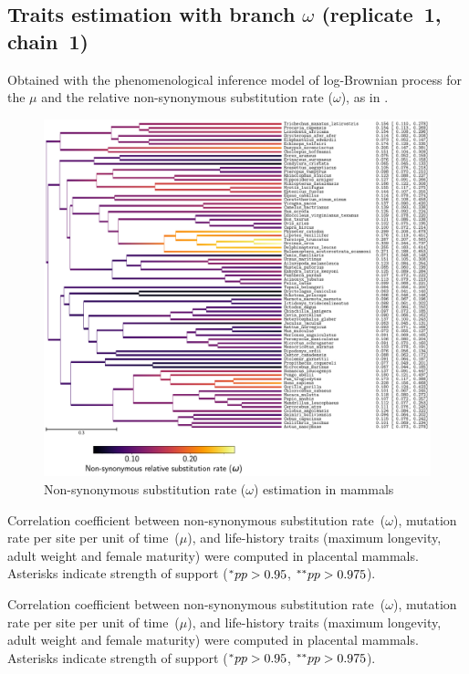 \documentclass{article}
\begin{document}
	\subsection{Traits estimation with branch \texorpdfstring{$\omega$}{ω} (replicate~1, chain~1)}
	Obtained with the phenomenological inference model of log-Brownian process for the $\mu$ and the relative {non-synonymous} {substitution} rate ($\omega$), as in \citet{Lartillot2011}.

	\begin{figure}[H]
		\centering
		\includegraphics[width=\linewidth, page=1]{mammals/18CDS_BranchOmega_R1_LogdNdS}
		\caption[$\omega$ estimation in mammals]{{Non-synonymous substitution} rate ($\omega$) estimation in mammals}
	\end{figure}

	\begin{table}[H]
		
		\caption[Correlation coefficient matrix in mammals ($\omega$)]{
		Correlation coefficient between {non-synonymous} {substitution} rate~($\omega$), mutation rate per site per unit of time~($\mu$), and life-history traits (maximum longevity, adult weight and female maturity) were computed in placental mammals.
		Asterisks indicate strength of support ($\smash{^{*}} pp > 0.95$, $\smash{^{**}} pp > 0.975$).}
	\end{table}

	\begin{table}[H]
		
		\caption[Covariance matrix in mammals ($\omega$)]{
		Correlation coefficient between {non-synonymous} {substitution} rate~($\omega$), mutation rate per site per unit of time~($\mu$), and life-history traits (maximum longevity, adult weight and female maturity) were computed in placental mammals.
		Asterisks indicate strength of support ($\smash{^{*}} pp > 0.95$, $\smash{^{**}} pp > 0.975$).}
	\end{table}
\end{document}
